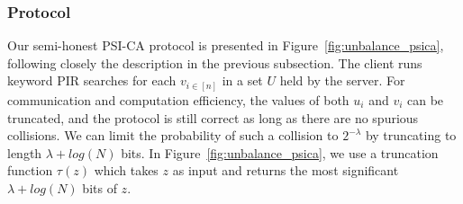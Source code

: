 \documentclass[11pt]{article} %
\newcommand{\figureref}[1]{Figure~\ref{#1}}
\begin{document}
\subsubsection{Protocol}
Our semi-honest PSI-CA protocol is presented in \figureref{fig:unbalance_psica}, following closely the description in the previous subsection. The client runs keyword PIR searches for each $v_{i\in [n]}$ in a set $U$ held by the server. For communication and computation efficiency, the values of both $u_i$ and $v_i$ can be truncated, and the protocol is still correct as long as there are no spurious collisions. We can limit the probability of such a collision to $2^{-\lambda}$ by truncating to length $\lambda + log(N)$ bits. In \figureref{fig:unbalance_psica}, we use a truncation function $\tau(z)$ which takes $z$ as input and returns the most significant $\lambda + log(N)$ bits of $z$.
\end{document}
